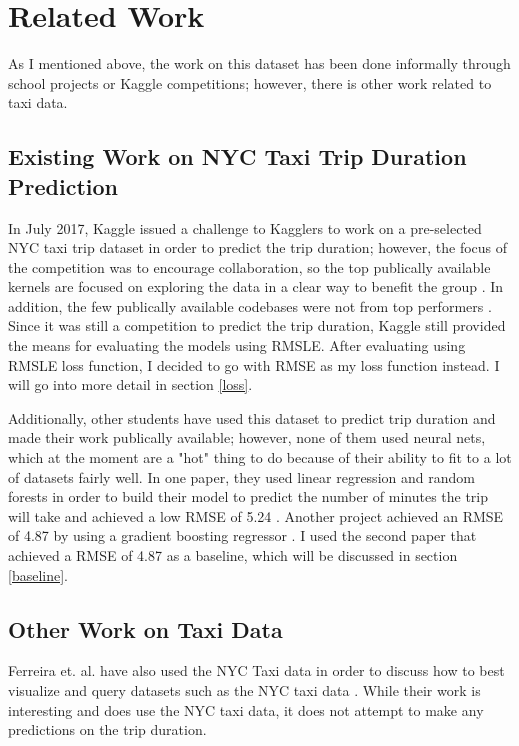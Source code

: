 \documentclass[conference]{IEEEtran}
\begin{document}
\section{Related Work}
As I mentioned above, the work on this dataset has been done informally through school projects or Kaggle competitions; however, there is other work related to taxi data.

\subsection{Existing Work on NYC Taxi Trip Duration Prediction}
In July 2017, Kaggle issued a challenge to Kagglers to work on a pre-selected NYC taxi trip dataset in order to predict the trip duration; however, the focus of the competition was to encourage collaboration, so the top publically available kernels are focused on exploring the data in a clear way to benefit the group \cite{kaggle}.  In addition, the few publically available codebases were not from top performers \cite{currie} \cite{yukw} \cite{mk}.  Since it was still a competition to predict the trip duration, Kaggle still provided the means for evaluating the models using RMSLE.  After evaluating using RMSLE loss function, I decided to go with RMSE as my loss function instead.  I will go into more detail in section \ref{loss}.

Additionally, other students have used this dataset to predict trip duration and made their work publically available; however, none of them used neural nets, which at the moment are a "hot" thing to do because of their ability to fit to a lot of datasets fairly well.  In one paper, they used linear regression and random forests in order to build their model to predict the number of minutes the trip will take and achieved a low RMSE of 5.24 \cite{stanford}.  Another project achieved an RMSE of 4.87 by using a gradient boosting regressor \cite{ucsd}.  I used the second paper that achieved a RMSE of 4.87 as a baseline, which will be discussed in section \ref{baseline}. 

\subsection{Other Work on Taxi Data}
Ferreira et. al. have also used the NYC Taxi data in order to discuss how to best visualize and query datasets such as the NYC taxi data \cite{query}.  While their work is interesting and does use the NYC taxi data, it does not attempt to make any predictions on the trip duration.
\end{document}

